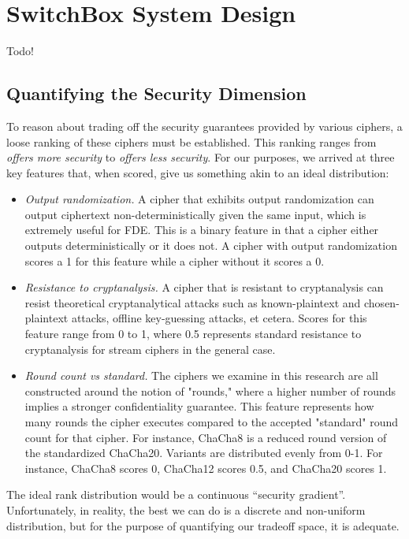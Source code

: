 \section{SwitchBox System Design}\label{sec:design}

Todo!

\subsection{Quantifying the Security Dimension}

To reason about trading off the security guarantees provided by various ciphers,
a loose ranking of these ciphers must be established. This ranking ranges from
\emph{offers more security} to \emph{offers less security}. For our purposes, we
arrived at three key features that, when scored, give us something akin to an
ideal distribution:

\begin{itemize}

 \item \emph{Output randomization.} A cipher that exhibits output randomization
 can output ciphertext non-deterministically given the same input, which is
 extremely useful for FDE\@. This is a binary feature in that a cipher either
 outputs deterministically or it does not. A cipher with output randomization
 scores a 1 for this feature while a cipher without it scores a 0.

 \item \emph{Resistance to cryptanalysis.} A cipher that is resistant to
 cryptanalysis can resist theoretical cryptanalytical attacks such as
 known-plaintext and chosen-plaintext attacks, offline key-guessing attacks, et
 cetera. Scores for this feature range from 0 to 1, where 0.5 represents
 standard resistance to cryptanalysis for stream ciphers in the general case\@.

 \item \emph{Round count vs standard.} The ciphers we examine in this research
 are all constructed around the notion of "rounds," where a higher number of
 rounds implies a stronger confidentiality guarantee. This feature represents
 how many rounds the cipher executes compared to the accepted "standard" round
 count for that cipher. For instance, ChaCha8 is a reduced round version of the
 standardized ChaCha20. Variants are distributed evenly from 0-1. For instance,
 ChaCha8 scores 0, ChaCha12 scores 0.5, and ChaCha20 scores 1\@.

\end{itemize}

The ideal rank distribution would be a continuous “security gradient”.
Unfortunately, in reality, the best we can do is a discrete and non-uniform
distribution, but for the purpose of quantifying our tradeoff space, it is
adequate.
